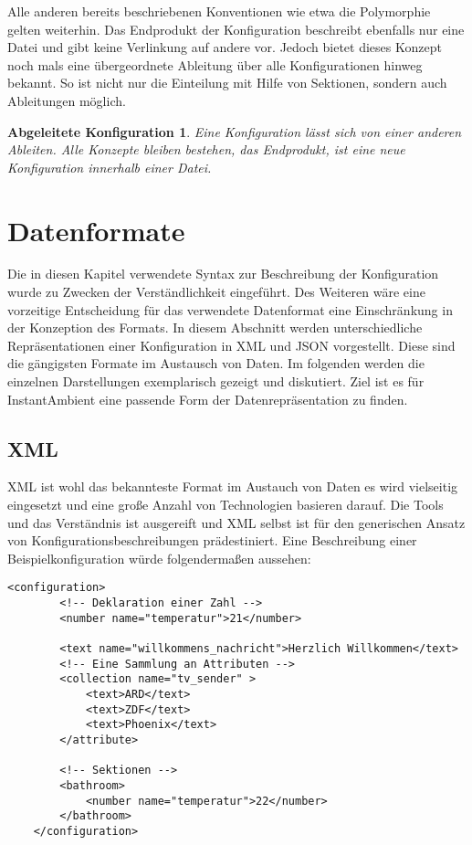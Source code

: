 Alle anderen bereits beschriebenen Konventionen wie etwa die Polymorphie gelten weiterhin. Das Endprodukt der Konfiguration beschreibt ebenfalls nur eine Datei und gibt keine Verlinkung auf andere vor. Jedoch bietet dieses Konzept noch mals eine übergeordnete Ableitung über alle Konfigurationen hinweg bekannt. So ist nicht nur die Einteilung mit Hilfe von Sektionen, sondern auch Ableitungen möglich. 

\newtheorem{mydef}{Abgeleitete Konfiguration}
\begin{mydef}
Eine Konfiguration lässt sich von einer anderen Ableiten. Alle Konzepte bleiben bestehen, das Endprodukt, ist eine neue Konfiguration innerhalb einer Datei. 
\end{mydef}


\section{Datenformate}
Die in diesen Kapitel verwendete Syntax zur Beschreibung der Konfiguration wurde zu Zwecken der Verständlichkeit eingeführt. Des Weiteren wäre eine vorzeitige Entscheidung für das verwendete Datenformat eine Einschränkung in der Konzeption des Formats. In diesem Abschnitt werden unterschiedliche Repräsentationen einer Konfiguration in XML und JSON vorgestellt. Diese sind die gängigsten Formate im Austausch von Daten. Im folgenden werden die einzelnen Darstellungen exemplarisch gezeigt und diskutiert. Ziel ist es für InstantAmbient eine passende Form der Datenrepräsentation zu finden. 

\subsection{XML}
XML ist wohl das bekannteste Format im Austauch von Daten es wird vielseitig eingesetzt und eine große Anzahl von Technologien basieren darauf. Die Tools und das Verständnis ist ausgereift und XML selbst ist für den generischen Ansatz von Konfigurationsbeschreibungen prädestiniert. Eine Beschreibung einer Beispielkonfiguration würde folgendermaßen aussehen: 

\lstset{language=XML}
\begin{lstlisting}[caption=XML-Konfiguration, captionpos=b]
	<configuration>
		<!-- Deklaration einer Zahl -->
		<number name="temperatur">21</number>
		
		<text name="willkommens_nachricht">Herzlich Willkommen</text>
		<!-- Eine Sammlung an Attributen -->
		<collection name="tv_sender" >
			<text>ARD</text>
			<text>ZDF</text>
			<text>Phoenix</text>
		</attribute>

		<!-- Sektionen -->
		<bathroom>
			<number name="temperatur">22</number>
		</bathroom>
	</configuration>
\end{lstlisting}

